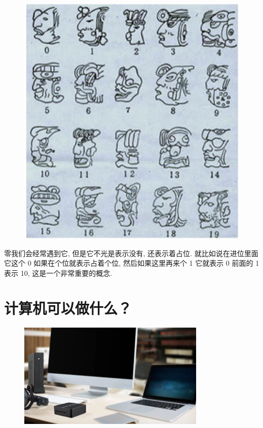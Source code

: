 \begin{figure}[ht]
\begin{minipage}[t]{0.4\textwidth}
    \includegraphics[width=\textwidth]{asset/71bac7f0-1042-47b2-a771-34b5eb04b656.png}
    \caption{}
    \label{fig:img2_10}
  \end{minipage}
\end{figure}

零我们会经常遇到它, 但是它不光是表示没有, 还表示着占位. 就比如说在进位里面它这个 0 如果在个位就表示占着个位, 然后如果这里再来个 1 它就表示 0 前面的 1 表示 10, 这是一个非常重要的概念. 

\section{计算机可以做什么？}

\begin{figure}[ht]
  \centering\includegraphics[width=0.8\textwidth]{asset/7b8b9bd7-b7db-4420-bcce-537d0be46a31.png}
  \caption{}
  \label{fig:img2_11}
\end{figure}

